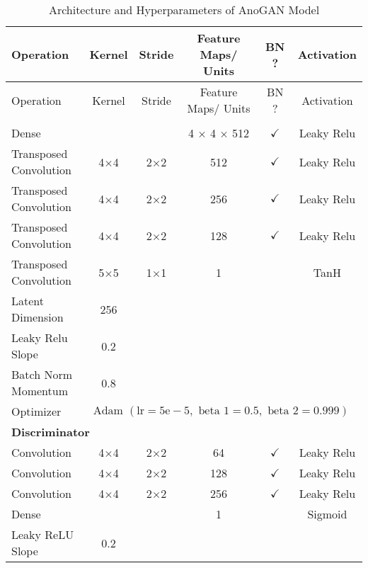 \footnotesize
\begin{longtable}[c]{@{}lccccc@{}}
	\caption{Architecture and Hyperparameters of AnoGAN Model}
	\label{tab:anogan_imp}\\
	\toprule
	Operation & Kernel & Stride & Feature Maps/ Units & BN ? & Activation \\* \midrule
	\endfirsthead
	\toprule
	Operation & Kernel & Stride & Feature Maps/ Units & BN ? & Activation \\* \midrule
	\endhead
	\bottomrule
	\endfoot
	\endlastfoot
	\multicolumn{6}{l}{\textbf{Generator}} \\
	Dense & \multicolumn{1}{c}{} &  & 4 $\times$ 4 $\times$ 512 & $\checkmark$ & Leaky Relu \\
	Transposed Convolution & \multicolumn{1}{c}{4$\times$4} & 2$\times$2 & 512 & $\checkmark$ & Leaky Relu \\
	Transposed Convolution & \multicolumn{1}{c}{4$\times$4} & 2$\times$2 & 256 & $\checkmark$ & Leaky Relu \\
	Transposed Convolution & \multicolumn{1}{c}{4$\times$4} & 2$\times$2 & 128 & $\checkmark$ & Leaky Relu \\
	Transposed Convolution & \multicolumn{1}{c}{5$\times$5} & 1$\times$1 & 1 &  & TanH \\ \hline
	Latent Dimension & 256 & \multicolumn{1}{l}{} & \multicolumn{1}{l}{} & \multicolumn{1}{l}{} & \multicolumn{1}{l}{} \\
	Leaky Relu Slope & 0.2 & \multicolumn{1}{l}{} & \multicolumn{1}{l}{} & \multicolumn{1}{l}{} & \multicolumn{1}{l}{} \\
	Batch Norm Momentum & 0.8 & \multicolumn{1}{l}{} & \multicolumn{1}{l}{} & \multicolumn{1}{l}{} & \multicolumn{1}{l}{} \\
	Optimizer & \multicolumn{5}{l}{$\text { Adam }(\mathrm{lr}=5 \mathrm{e}-5, \text { beta } 1=0.5, \text { beta } 2=0.999)$} \\ \hline
	\multicolumn{6}{l}{\textbf{Discriminator}} \\
	Convolution & \multicolumn{1}{c}{4$\times$4} & 2$\times$2 & 64 & $\checkmark$ & Leaky Relu \\
	Convolution & \multicolumn{1}{c}{4$\times$4} & 2$\times$2 & 128 & $\checkmark$ & Leaky Relu \\
	Convolution & \multicolumn{1}{c}{4$\times$4} & 2$\times$2 & 256 & $\checkmark$ & Leaky Relu \\
	Dense & \multicolumn{1}{c}{} &  & 1 &  & Sigmoid \\ \hline
	Leaky ReLU Slope & 0.2 & \multicolumn{1}{l}{} & \multicolumn{1}{l}{} & \multicolumn{1}{l}{} & \multicolumn{1}{l}{} \\

\end{longtable}
